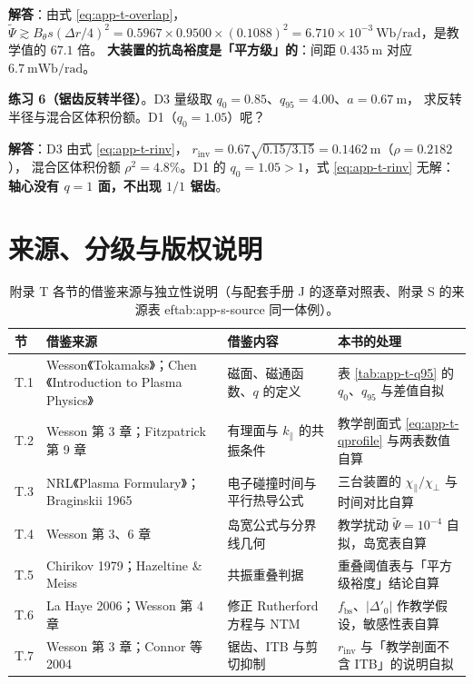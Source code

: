 \textbf{解答}：由式 \eqref{eq:app-t-overlap}，
$\tilde\Psi\gtrsim B_\theta s(\Delta r/4)^2=0.5967\times0.9500\times(0.1088)^2
=6.710\times10^{-3}\ \mathrm{Wb/rad}$，是教学值的 $67.1$ 倍。
\textbf{大装置的抗岛裕度是「平方级」的}：间距 $0.435\ \mathrm{m}$ 对应 $6.7\ \mathrm{mWb/rad}$。

\textbf{练习 6（锯齿反转半径）}。D3 量级取 $q_0=0.85$、$q_{95}=4.00$、$a=0.67\ \mathrm{m}$，
求反转半径与混合区体积份额。D1（$q_0=1.05$）呢？

\textbf{解答}：D3 由式 \eqref{eq:app-t-rinv}，
$r_{\mathrm{inv}}=0.67\sqrt{0.15/3.15}=0.1462\ \mathrm{m}$（$\rho=0.2182$），
混合区体积份额 $\rho^2=4.8\%$。D1 的 $q_0=1.05>1$，式 \eqref{eq:app-t-rinv} 无解：
\textbf{轴心没有 $q=1$ 面，不出现 $1/1$ 锯齿}。

\section{来源、分级与版权说明}
\label{sec:app-t-source}

\begingroup\small
\begin{table}[htbp]
  \centering
  \caption{附录 T 各节的借鉴来源与独立性说明（与配套手册 J 的逐章对照表、附录 S 的来源表 
ef{tab:app-s-source} 同一体例）。}
  \label{tab:app-t-source}
  \begin{tabular}{@{}p{1.1cm}p{4.4cm}p{3.4cm}p{6.4cm}@{}}
    \toprule
    节 & 借鉴来源 & 借鉴内容 & 本书的处理 \\
    \midrule
    T.1 & Wesson《Tokamaks》；Chen《Introduction to Plasma Physics》 & 磁面、磁通函数、$q$ 的定义 & 表 \ref{tab:app-t-q95} 的 $q_0$、$q_{95}$ 与差值自拟 \\
    T.2 & Wesson 第 3 章；Fitzpatrick 第 9 章 & 有理面与 $k_\parallel$ 的共振条件 & 教学剖面式 \eqref{eq:app-t-qprofile} 与两表数值自算 \\
    T.3 & NRL《Plasma Formulary》；Braginskii 1965 & 电子碰撞时间与平行热导公式 & 三台装置的 $\chi_\parallel/\chi_\perp$ 与时间对比自算 \\
    T.4 & Wesson 第 3、6 章 & 岛宽公式与分界线几何 & 教学扰动 $\tilde\Psi=10^{-4}$ 自拟，岛宽表自算 \\
    T.5 & Chirikov 1979；Hazeltine \& Meiss & 共振重叠判据 & 重叠阈值表与「平方级裕度」结论自算 \\
    T.6 & La Haye 2006；Wesson 第 4 章 & 修正 Rutherford 方程与 NTM & $f_{\mathrm{bs}}$、$|\Delta'_0|$ 作教学假设，敏感性表自算 \\
    T.7 & Wesson 第 3 章；Connor 等 2004 & 锯齿、ITB 与剪切抑制 & $r_{\mathrm{inv}}$ 与「教学剖面不含 ITB」的说明自拟 \\
    \bottomrule
  \end{tabular}
\end{table}

